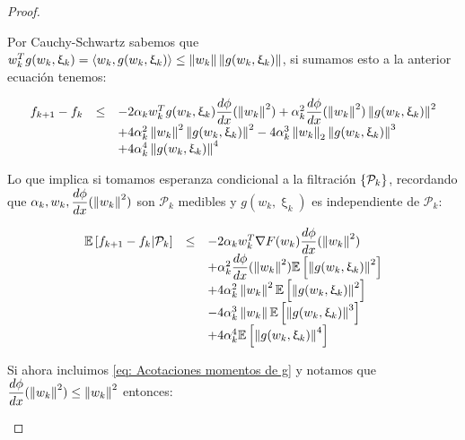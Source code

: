 \begin{proof}
\begin{enumerate}
		Por Cauchy-Schwartz sabemos que $w_k^Tg(w_k, \upxi_{k}) = \left\langle w_k, g(w_k, \upxi_{k})\right\rangle \leq \left\lVert w_k\right\rVert \left\lVert g(w_k, \upxi_{k})\right\rVert$, si sumamos esto a la anterior ecuaci\'on tenemos:
		
		\begin{equation*}
		\begin{array}{rcl}
		f_{k+1} - f_k & \leq & -2 \alpha_k w_k^Tg(w_k, \upxi_{k}) \dfrac{d \phi}{dx}(\left\lVert w_k\right\rVert^2)  + \alpha_k^2 \dfrac{d \phi}{dx}(\left\lVert w_k\right\rVert^2) \left\lVert g(w_k, \upxi_{k})\right\rVert^2 \\ 
		& & + 4 \alpha_k^2 \left\lVert w_k\right\rVert^2 \left\lVert g(w_k, \upxi_{k})\right\rVert^2 -4 \alpha_k^3 \left\lVert w_k\right\rVert_2 \left\lVert g(w_k, \upxi_{k})\right\rVert^3  \\
		& & + 4 \alpha_k^4 \left\lVert g(w_k, \upxi_{k})\right\rVert^4 \\
		\end{array}
		\end{equation*}
		
		Lo que implica si tomamos esperanza condicional a la filtraci\'on $\left\lbrace\mathcal{P}_k\right\rbrace$, recordando que $\alpha_k, w_k, \dfrac{d \phi}{dx}(\left\lVert w_k\right\rVert^2)$ son $\mathcal{P}_k$ medibles y $g(w_k, \upxi_{k})$ es independiente de $\mathcal{P}_k$:
		
		\begin{equation*}
		\begin{array}{rcl}
		\mathbb{E} \left[{f_{k+1} - f_k} \vert \mathcal{P}_{k}\right] & \leq & -2 \alpha_k w_k^T\nabla F (w_k)\dfrac{d \phi}{dx}(\left\lVert w_k\right\rVert^2) \\ 
		&& + \alpha_k^2 \dfrac{d \phi}{dx}(\left\lVert w_k\right\rVert^2) \mathbb{E} \left[\left\lVert g(w_k, \upxi_{k})\right\rVert^2\right] \\ 
		& & + 4 \alpha_k^2 \left\lVert w_k\right\rVert^2 \mathbb{E} \left[\left\lVert g(w_k, \upxi_{k})\right\rVert^2\right] \\
		& & -4 \alpha_k^3 \left\lVert w_k\right\rVert \mathbb{E} \left[\left\lVert g(w_k, \upxi_{k})\right\rVert^3\right]  \\
		& & + 4 \alpha_k^4 \mathbb{E} \left[\left\lVert g(w_k, \upxi_{k})\right\rVert^4\right] \\
		\end{array}
		\end{equation*}
		
		Si ahora incluimos \ref{eq: Acotaciones momentos de g} y notamos que $\dfrac{d \phi}{dx}(\left\lVert w_k\right\rVert^2) \leq \left\lVert w_k\right\rVert^2$ entonces:
		

\end{enumerate}
\end{proof}
